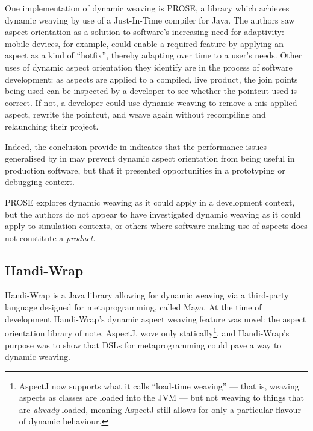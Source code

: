  One implementation of dynamic weaving is
PROSE\cite{popovici2002PROSE,popovici2003JITaspects}, a library which achieves
dynamic weaving by use of a Just-In-Time compiler for Java. The authors saw
aspect orientation as a solution to software's increasing need for adaptivity:
mobile devices, for example, could enable a required feature by applying an
aspect as a kind of ``hotfix'', thereby adapting over time to a user's needs.
Other uses of dynamic aspect orientation they identify are in the process of
software development: as aspects are applied to a compiled, live product, the
join points being used can be inspected by a developer to see whether the
pointcut used is correct. If not, a developer could use dynamic weaving to
remove a mis-applied aspect, rewrite the pointcut, and weave again without
recompiling and relaunching their project.

Indeed, the conclusion \citeauthor{popovici2003JITaspects} provide in
\cite{popovici2003JITaspects} indicates that the performance issues generalised
by \citeauthor{dynamicAOchitchyan} in \cite{dynamicAOchitchyan} may prevent
dynamic aspect orientation from being useful in production software, but that
it presented opportunities in a prototyping or debugging context.

PROSE explores dynamic weaving as it could apply in a development context, but
the authors do not appear to have investigated dynamic weaving as it could apply
to simulation contexts, or others where software making use of aspects does not
constitute a \emph{product}.


\subsection{Handi-Wrap}
Handi-Wrap\cite{Baker_2002} is a Java library allowing for dynamic weaving via a
third-party language designed for metaprogramming, called Maya. At the time of
development Handi-Wrap's dynamic aspect weaving feature was novel: the aspect
orientation library of note, AspectJ, wove only statically\footnote{AspectJ now
supports what it calls ``load-time weaving'' --- that is, weaving aspects as
classes are loaded into the JVM --- but not weaving to things that are
\emph{already} loaded, meaning AspectJ still allows for only a particular
flavour of dynamic behaviour.}, and Handi-Wrap's purpose was to show that DSLs
for metaprogramming could pave a way to dynamic weaving.

